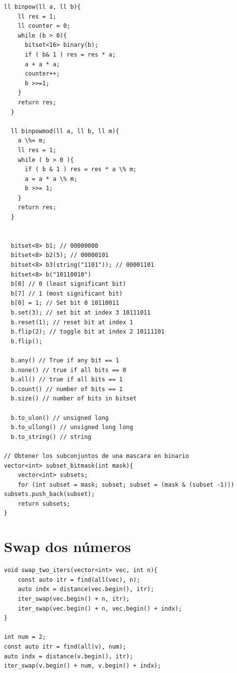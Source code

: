 \documentclass{article}
\begin{document}
\begin{lstlisting}[style=cppstyle]
  ll binpow(ll a, ll b){
    ll res = 1;
    ll counter = 0;
    while (b > 0){
      bitset<16> binary(b);
      if ( b& 1 ) res = res * a;
      a + a * a;
      counter++;
      b >>=1;
    }
    return res;
  }

  ll binpowmod(ll a, ll b, ll m){
    a \%= m;
    ll res = 1;
    while ( b > 0 ){
      if ( b & 1 ) res = res * a \% m;
      a = a * a \% m;
      b >>= 1;
    }
    return res;
  }


  bitset<8> b1; // 00000000
  bitset<8> b2(5); // 00000101
  bitset<8> b3(string("1101")); // 00001101
  bitset<8> b("10110010")
  b[0] // 0 (least significant bit)
  b[7] // 1 (most significant bit)
  b[0] = 1; // Set bit 0 10110011
  b.set(3); // set bit at index 3 10111011
  b.reset(1); // reset bit at index 1
  b.flip(2); // toggle bit at index 2 10111101
  b.flip();

  b.any() // True if any bit == 1
  b.none() // true if all bits == 0
  b.all() // true if all bits == 1
  b.count() // number of bits == 1
  b.size() // number of bits in bitset

  b.to_ulon() // unsigned long
  b.to_ullong() // unsigned long long
  b.to_string() // string

// Obtener los subconjuntos de una mascara en binario
vector<int> subset_bitmask(int mask){
    vector<int> subsets;
    for (int subset = mask; subset; subset = (mask & (subset -1))) subsets.push_back(subset);
    return subsets;
}
\end{lstlisting}

\section{Swap dos números}


\begin{lstlisting}[style=cppstyle]
void swap_two_iters(vector<int> vec, int n){
    const auto itr = find(all(vec), n);
    auto indx = distance(vec.begin(), itr);
    iter_swap(vec.begin() + n, itr);
    iter_swap(vec.begin() + n, vec.begin() + indx);
}

int num = 2;
const auto itr = find(all(v), num);
auto indx = distance(v.begin(), itr);
iter_swap(v.begin() + num, v.begin() + indx);
\end{lstlisting}
\end{document}
